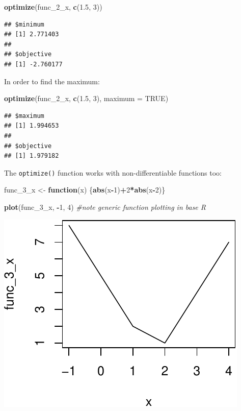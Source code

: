 \documentclass[11pt,]{article}
\newenvironment{Shaded}{\begin{snugshade}}{\end{snugshade}}
\newcommand{\KeywordTok}[1]{\textcolor[rgb]{0.13,0.29,0.53}{\textbf{#1}}}
\newcommand{\DataTypeTok}[1]{\textcolor[rgb]{0.13,0.29,0.53}{#1}}
\newcommand{\DecValTok}[1]{\textcolor[rgb]{0.00,0.00,0.81}{#1}}
\newcommand{\FloatTok}[1]{\textcolor[rgb]{0.00,0.00,0.81}{#1}}
\newcommand{\StringTok}[1]{\textcolor[rgb]{0.31,0.60,0.02}{#1}}
\newcommand{\CommentTok}[1]{\textcolor[rgb]{0.56,0.35,0.01}{\textit{#1}}}
\newcommand{\OtherTok}[1]{\textcolor[rgb]{0.56,0.35,0.01}{#1}}
\newcommand{\ControlFlowTok}[1]{\textcolor[rgb]{0.13,0.29,0.53}{\textbf{#1}}}
\newcommand{\OperatorTok}[1]{\textcolor[rgb]{0.81,0.36,0.00}{\textbf{#1}}}
\newcommand{\NormalTok}[1]{#1}
\begin{document}
\begin{Shaded}
\begin{Highlighting}[]
\KeywordTok{optimize}\NormalTok{(func_2_x, }\KeywordTok{c}\NormalTok{(}\FloatTok{1.5}\NormalTok{, }\DecValTok{3}\NormalTok{))}
\end{Highlighting}
\end{Shaded}

\begin{verbatim}
## $minimum
## [1] 2.771403
## 
## $objective
## [1] -2.760177
\end{verbatim}

In order to find the maximum:

\begin{Shaded}
\begin{Highlighting}[]
\KeywordTok{optimize}\NormalTok{(func_2_x, }\KeywordTok{c}\NormalTok{(}\FloatTok{1.5}\NormalTok{, }\DecValTok{3}\NormalTok{), }\DataTypeTok{maximum =} \OtherTok{TRUE}\NormalTok{)}
\end{Highlighting}
\end{Shaded}

\begin{verbatim}
## $maximum
## [1] 1.994653
## 
## $objective
## [1] 1.979182
\end{verbatim}

The \texttt{optimize()} function works with non-differentiable functions
too:

\begin{Shaded}
\begin{Highlighting}[]
\NormalTok{func_3_x <-}\StringTok{ }\ControlFlowTok{function}\NormalTok{(x) \{}\KeywordTok{abs}\NormalTok{(x}\OperatorTok{-}\DecValTok{1}\NormalTok{)}\OperatorTok{+}\DecValTok{2}\OperatorTok{*}\KeywordTok{abs}\NormalTok{(x}\OperatorTok{-}\DecValTok{2}\NormalTok{)\}}

\KeywordTok{plot}\NormalTok{(func_3_x, }\OperatorTok{-}\DecValTok{1}\NormalTok{, }\DecValTok{4}\NormalTok{) }\CommentTok{#note generic function plotting in base R}
\end{Highlighting}
\end{Shaded}

\begin{center}\includegraphics{Optimization_files/figure-latex/optimize_non_diff-1} \end{center}
\end{document}
